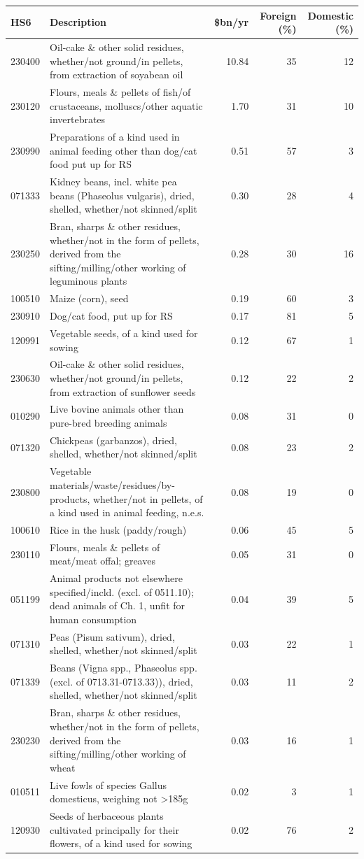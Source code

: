 \begin{tabular}{@{}l p{7.5cm} r r r@{}}
\toprule
HS6 & Description & \$bn/yr & Foreign (\%) & Domestic (\%) \\
\midrule
230400 & Oil-cake \& other solid residues, whether/not ground/in pellets, from extraction of soyabean oil & 10.84 & 35 & 12 \\
230120 & Flours, meals \& pellets of fish/of crustaceans, molluscs/other aquatic invertebrates & 1.70 & 31 & 10 \\
230990 & Preparations of a kind used in animal feeding other than dog/cat food put up for RS & 0.51 & 57 & 3 \\
071333 & Kidney beans, incl. white pea beans (Phaseolus vulgaris), dried, shelled, whether/not skinned/split & 0.30 & 28 & 4 \\
230250 & Bran, sharps \& other residues, whether/not in the form of pellets, derived from the sifting/milling/other working of leguminous plants & 0.28 & 30 & 16 \\
100510 & Maize (corn), seed & 0.19 & 60 & 3 \\
230910 & Dog/cat food, put up for RS & 0.17 & 81 & 5 \\
120991 & Vegetable seeds, of a kind used for sowing & 0.12 & 67 & 1 \\
230630 & Oil-cake \& other solid residues, whether/not ground/in pellets, from extraction of sunflower seeds & 0.12 & 22 & 2 \\
010290 & Live bovine animals other than pure-bred breeding animals & 0.08 & 31 & 0 \\
071320 & Chickpeas (garbanzos), dried, shelled, whether/not skinned/split & 0.08 & 23 & 2 \\
230800 & Vegetable materials/waste/residues/by-products, whether/not in pellets, of a kind used in animal feeding, n.e.s. & 0.08 & 19 & 0 \\
100610 & Rice in the husk (paddy/rough) & 0.06 & 45 & 5 \\
230110 & Flours, meals \& pellets of meat/meat offal; greaves & 0.05 & 31 & 0 \\
051199 & Animal products not elsewhere specified/incld. (excl. of 0511.10); dead animals of Ch. 1, unfit for human consumption & 0.04 & 39 & 5 \\
071310 & Peas (Pisum sativum), dried, shelled, whether/not skinned/split & 0.03 & 22 & 1 \\
071339 & Beans (Vigna spp., Phaseolus spp. (excl. of 0713.31-0713.33)), dried, shelled, whether/not skinned/split & 0.03 & 11 & 2 \\
230230 & Bran, sharps \& other residues, whether/not in the form of pellets, derived from the sifting/milling/other working of wheat & 0.03 & 16 & 1 \\
010511 & Live fowls of species Gallus domesticus, weighing not >185g & 0.02 & 3 & 1 \\
120930 & Seeds of herbaceous plants cultivated principally for their flowers, of a kind used for sowing & 0.02 & 76 & 2 \\
\bottomrule
\end{tabular}
